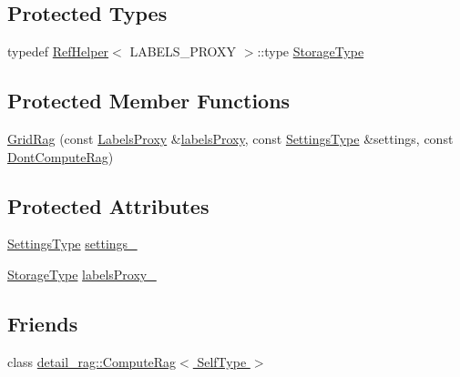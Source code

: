 \subsection*{Protected Types}
\begin{DoxyCompactItemize}
\item 
typedef \hyperlink{structnifty_1_1graph_1_1RefHelper}{Ref\+Helper}$<$ L\+A\+B\+E\+L\+S\+\_\+\+P\+R\+O\+X\+Y $>$\+::type \hyperlink{classnifty_1_1graph_1_1GridRag_ae7dcf657b20ef49d062648978e192cdb}{Storage\+Type}
\end{DoxyCompactItemize}
\subsection*{Protected Member Functions}
\begin{DoxyCompactItemize}
\item 
\hyperlink{classnifty_1_1graph_1_1GridRag_a559717d346c6e2e626994c1018fc5761}{Grid\+Rag} (const \hyperlink{classnifty_1_1graph_1_1GridRag_ad3146f72301da4f45b51e3b692776cf1}{Labels\+Proxy} \&\hyperlink{classnifty_1_1graph_1_1GridRag_a9a9b20451bd5ea8ce3ee11af4018c995}{labels\+Proxy}, const \hyperlink{structnifty_1_1graph_1_1GridRag_1_1SettingsType}{Settings\+Type} \&settings, const \hyperlink{structnifty_1_1graph_1_1GridRag_1_1DontComputeRag}{Dont\+Compute\+Rag})
\end{DoxyCompactItemize}
\subsection*{Protected Attributes}
\begin{DoxyCompactItemize}
\item 
\hyperlink{structnifty_1_1graph_1_1GridRag_1_1SettingsType}{Settings\+Type} \hyperlink{classnifty_1_1graph_1_1GridRag_af4610f430b2ed52e5a4ea54c1eddcaf1}{settings\+\_\+}
\item 
\hyperlink{classnifty_1_1graph_1_1GridRag_ae7dcf657b20ef49d062648978e192cdb}{Storage\+Type} \hyperlink{classnifty_1_1graph_1_1GridRag_abaacb5cd2582a08e27ec4af04f5e9881}{labels\+Proxy\+\_\+}
\end{DoxyCompactItemize}
\subsection*{Friends}
\begin{DoxyCompactItemize}
\item 
class \hyperlink{classnifty_1_1graph_1_1GridRag_abafcbd3543961eb6e4ee794aa6a62d66}{detail\+\_\+rag\+::\+Compute\+Rag$<$ Self\+Type $>$}
\end{DoxyCompactItemize}


